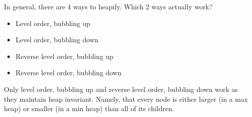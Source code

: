 \question In general, there are 4 ways to heapify. Which 2 ways actually work?

\begin{itemize}
\item Level order, bubbling up
\item Level order, bubbling down
\item Reverse level order, bubbling up
\item Reverse level order, bubbling down
\end{itemize}

\begin{solution}
Only level order, bubbling up and reverse level order, bubbling down work as
they maintain heap invariant. Namely, that every node is either larger (in a
max heap) or smaller (in a min heap) than all of its children.
\end{solution}
